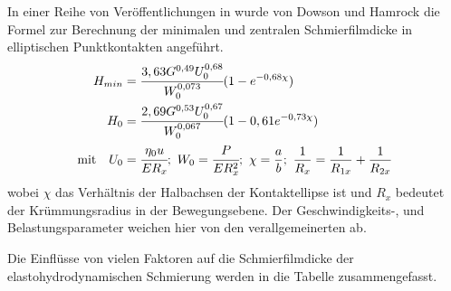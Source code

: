 In einer Reihe von Veröffentlichungen in \cite{hamrock_dowson_1976_a}\cite{hamrock_dowson_1976_b}\cite{hamrock_dowson_1977_a}\cite{hamrock_dowson_1977_b} wurde von Dowson und Hamrock die Formel zur Berechnung der minimalen und zentralen Schmierfilmdicke in elliptischen Punktkontakten angeführt.
\begin{align}
    \label{eq:mininmale_schmierfilmdicke_downson_hamrock}
    H_{min} &= \cfrac{3,63 G^{0,49} U_0^{0,68}}{W_0^{0,073}} (1 - e^{-0,68 \chi}) \\
    \label{eq:zentrale_schmierfilmdicke_downson_hamrock}
    H_0 &= \cfrac{2,69 G^{0,53} U_0^{0,67}}{W_0^{0,067}} (1 - 0,61 e^{-0,73 \chi}) \\
    \text{mit} \quad
    U_0 &= \cfrac{\eta_0 u}{E R_x};\ 
    W_0 = \cfrac{P}{E R_x^2};\
    \chi = \frac{a}{b};\
    \frac{1}{R_x} = \frac{1}{R_{1x}} + \frac{1}{R_{2x}} \nonumber 
\end{align}
%
wobei $\chi$ das Verhältnis der Halbachsen der Kontaktellipse ist und $R_x$ bedeutet der Krümmungsradius in der Bewegungsebene.
Der Geschwindigkeits-, und Belastungsparameter weichen hier von den verallgemeinerten ab.

Die Einflüsse von vielen Faktoren auf die Schmierfilmdicke der elastohydrodynamischen Schmierung werden in die Tabelle zusammengefasst.

